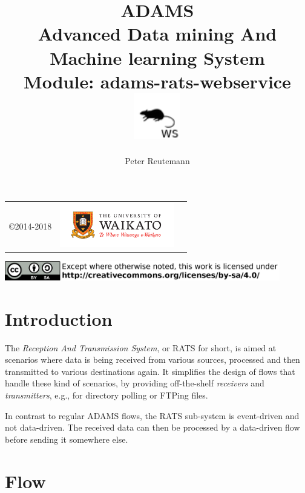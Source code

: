 \documentclass[a4paper]{book}
\title{
  \textbf{ADAMS} \\
  {\Large \textbf{A}dvanced \textbf{D}ata mining \textbf{A}nd \textbf{M}achine
  learning \textbf{S}ystem} \\
  {\Large Module: adams-rats-webservice} \\
  \vspace{1cm}
  \includegraphics[width=2cm]{images/rats-webservice-module.png} \\
}
\author{
  Peter Reutemann
}
\begin{document}
\begin{titlepage}
\maketitle

\thispagestyle{empty}
\center
\begin{table}[b]
	\begin{tabular}{c l l}
		\parbox[c][2cm]{2cm}{\copyright 2014-2018} &
		\parbox[c][2cm]{5cm}{\includegraphics[width=5cm]{images/coat_of_arms.pdf}}
	\end{tabular}
	\includegraphics[width=12cm]{images/cc.png} \\
\end{table}

\end{titlepage}

\tableofcontents

\chapter{Introduction}
The \textit{Reception And Transmission System}, or RATS for short, is aimed
at scenarios where data is being received from various sources, processed
and then transmitted to various destinations again. It simplifies the design
of flows that handle these kind of scenarios, by providing off-the-shelf
\textit{receivers} and \textit{transmitters}, e.g., for directory polling
or FTPing files.

In contrast to regular ADAMS flows, the RATS sub-system is event-driven
and not data-driven. The received data can then be processed by a data-driven
flow before sending it somewhere else.


\chapter{Flow}
\end{document}
